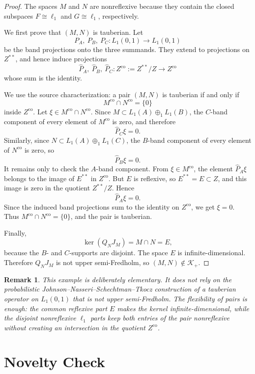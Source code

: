 \documentclass[11pt]{article}
\newtheorem{remark}{Remark}
\newcommand{\co}{\mathrm{co}}
\newcommand{\oplusone}{\oplus_1}
\begin{document}
\begin{proof}
The spaces \(M\) and \(N\) are nonreflexive because they contain the closed
subspaces \(F\cong\ell_1\) and \(G\cong\ell_1\), respectively.

We first prove that \((M,N)\) is tauberian.  Let
\[
  P_A,\ P_B,\ P_C:L_1(0,1)\to L_1(0,1)
\]
be the band projections onto the three summands.  They extend to projections
on \(Z^{**}\), and hence induce projections
\[
  \widehat P_A,\ \widehat P_B,\ \widehat P_C: Z^\co:=Z^{**}/Z\to Z^\co
\]
whose sum is the identity.

We use the source characterization: a pair \((M,N)\) is tauberian if and only
if
\[
  M^\co\cap N^\co=\{0\}
\]
inside \(Z^\co\).  Let \(\xi\in M^\co\cap N^\co\).  Since \(M\subset
L_1(A)\oplusone L_1(B)\), the \(C\)-band component of every element of
\(M^\co\) is zero, and therefore
\[
  \widehat P_C\xi=0.
\]
Similarly, since \(N\subset L_1(A)\oplusone L_1(C)\), the \(B\)-band component
of every element of \(N^\co\) is zero, so
\[
  \widehat P_B\xi=0.
\]
It remains only to check the \(A\)-band component.  From
\(\xi\in M^\co\), the element \(\widehat P_A\xi\) belongs to the image of
\(E^{**}\) in \(Z^\co\).  But \(E\) is reflexive, so \(E^{**}=E\subset Z\),
and this image is zero in the quotient \(Z^{**}/Z\).  Hence
\[
  \widehat P_A\xi=0.
\]
Since the induced band projections sum to the identity on \(Z^\co\), we get
\(\xi=0\).  Thus \(M^\co\cap N^\co=\{0\}\), and the pair is tauberian.

Finally,
\[
  \ker(Q_NJ_M)=M\cap N=E,
\]
because the \(B\)- and \(C\)-supports are disjoint.  The space \(E\) is
infinite-dimensional.  Therefore \(Q_NJ_M\) is not upper semi-Fredholm, so
\((M,N)\notin\mathcal K_+\).
\end{proof}

\begin{remark}
This example is deliberately elementary.  It does not rely on the probabilistic
Johnson--Nasseri--Schechtman--Tkocz construction of a tauberian operator on
\(L_1(0,1)\) that is not upper semi-Fredholm.  The flexibility of pairs is
enough: the common reflexive part \(E\) makes the kernel infinite-dimensional,
while the disjoint nonreflexive \(\ell_1\) parts keep both entries of the pair
nonreflexive without creating an intersection in the quotient \(Z^\co\).
\end{remark}

\section*{Novelty Check}
\end{document}
